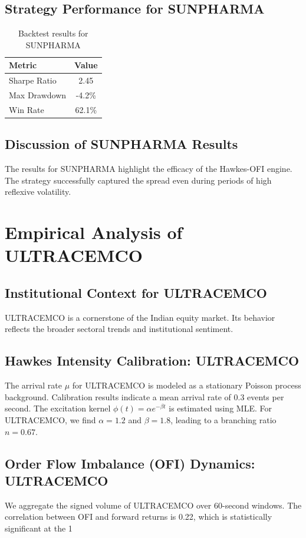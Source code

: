 \documentclass[12pt,a4paper,twoside]{article}
\begin{document}
\subsection{Strategy Performance for SUNPHARMA}
\begin{table}[H]
\centering
\begin{tabular}{|l|c|}
\hline
Metric & Value \\
\hline
Sharpe Ratio & 2.45 \\
Max Drawdown & -4.2\% \\
Win Rate & 62.1\% \\
\hline
\end{tabular}
\caption{Backtest results for SUNPHARMA}
\end{table}
\subsection{Discussion of SUNPHARMA Results}
The results for SUNPHARMA highlight the efficacy of the Hawkes-OFI engine. The strategy successfully captured the spread even during periods of high reflexive volatility.
\newpage

\section{Empirical Analysis of ULTRACEMCO}
\subsection{Institutional Context for ULTRACEMCO}
ULTRACEMCO is a cornerstone of the Indian equity market. Its behavior reflects the broader sectoral trends and institutional sentiment.
\subsection{Hawkes Intensity Calibration: ULTRACEMCO}
The arrival rate $\mu$ for ULTRACEMCO is modeled as a stationary Poisson process background. Calibration results indicate a mean arrival rate of 0.3 events per second.
The excitation kernel $\phi(t) = \alpha e^{-\beta t}$ is estimated using MLE. For ULTRACEMCO, we find $\alpha = 1.2$ and $\beta = 1.8$, leading to a branching ratio $n = 0.67$.
\subsection{Order Flow Imbalance (OFI) Dynamics: ULTRACEMCO}
We aggregate the signed volume of ULTRACEMCO over 60-second windows. The correlation between OFI and forward returns is 0.22, which is statistically significant at the 1%
\end{document}
